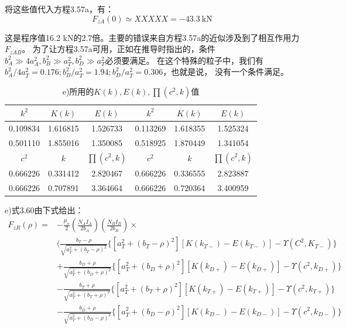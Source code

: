 将这些值代入方程3.57a，有：
\begin{equation*}
F_{zA}(0)\simeq XXXXX =-43.3\ \mathrm{kN}
\end{equation*}

这是程序值16.2 kN的2.7倍。主要的错误来自方程3.57a的近似涉及到了相互作用力$F_{zAB}$。
为了让方程3.57a可用，正如在推导时指出的，条件$b_A^2\gg  4a_A^2,b^2_B\gg  a_T^2, b_D^2\gg a_T^2$必须要满足。
在这个特殊的粒子中，我们有$b_A^2/4a_T^2=0.176;b^2_B/a_T^2 = 1.94; b_D^2/a_T^2 = 0.306$，也就是说，
没有一个条件满足。

\begin{table}[htbp]\small
\centering
\caption{e)所用的$K(k),E(k),\prod(c^2,k)$值}
	\begin{tabular}{|c|c|c|c|c|c|}
		\hline
		$k^2$ & $K(k)$&$E(k)$    & $k^2$       &$K(k)$     & $E(k)$     \\ \hline
		0.109834 &1.616815 & 1.526733 &0.113269 &1.618355&1.525324\\ \hline
	0.501110 &{1.855016} &{1.350085} &{0.518925} &{1.870449} & {1.341054} \\ \hline \hline
		${c^2}$        & ${k}$        & ${\prod(c^2,k)}$        &${c^2}$        & ${k} $       &${\prod(c^2,k)}$        \\ \hline
		{0.666226} & {0.331412} & {2.820467} & {0.666226} &{0.336555} & {2.823887} \\ \hline
		{0.666226} & {0.707891} & {3.364664} &{0.666226} &{0.720364} &{3.400959} \\ \hline
	\end{tabular}
\end{table}


e)式3.60由下式给出：
\begin{align*}
F_{zR}(\rho)=&-\frac{\mu_{o}}{2}(\frac{N_{A}I_{A}}{2b_{A}})(\frac{N_{B}I_{B}}{2b_{B}})\times\\
&(\frac{b_{T}-\rho}{\sqrt{a_{T}^{2}+(b_{T}-\rho)^{2}}}\{[a_{T}^{2}+(b_{T}-\rho)^{2}][K(k_{T-})-E(k_{T-})]-\Upsilon(C^{2},K_{T-})\}\\
&+\frac{b_{D}+\rho}{\sqrt{a_{T}^{2}+(b_{D}+\rho)^{2}}}\{[a_{T}^{2}+(b_{D}+\rho)^{2}][K(k_{D+})-E(k_{D+})]-\Upsilon(c^{2},k_{D+})\}\\
&-\frac{b_{T}+\rho}{\sqrt{a_{T}^{2}+(b_{T}+\rho)^{2}}}\{[a_{T}^{2}+(b_{T}+\rho)^{2}][K(k_{T+})-E(k_{T+})]-\Upsilon(c^{2},k_{T+})\}\\
&-\frac{b_{D}+\rho}{\sqrt{a_{T}^{2}+(b_{D}-\rho)^{2}}}\{[a_{T}^{2}+(b_{D}-\rho)^{2}][K(k_{D-})-E(k_{D-})]-\Upsilon(c^{2},k_{D-})\}\\\tag{3.60}
\end{align*}

